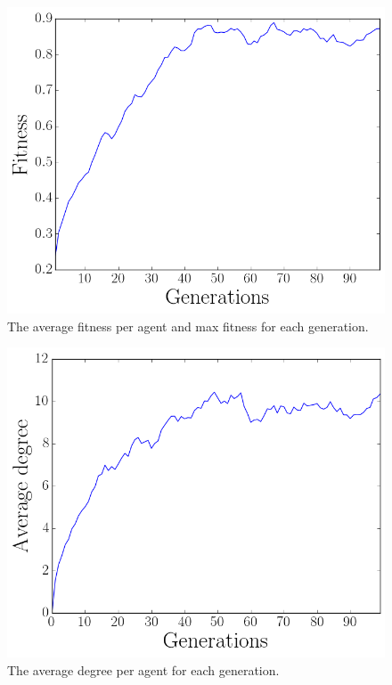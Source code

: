 \begin{figure}[htbp]
    \centering
    \includegraphics[scale=0.5]{fig/Results/Exp1/Fitness1}
    \caption{The average fitness per agent and max fitness for each generation.}
    \label{fig:Fitness}
\end{figure}
\begin{figure}[htbp]
    \centering
    \includegraphics[scale=0.5]{fig/Results/Exp1/Degree1}
    \caption{The average degree per agent for each generation.}
    \label{fig:Degree}
\end{figure}

